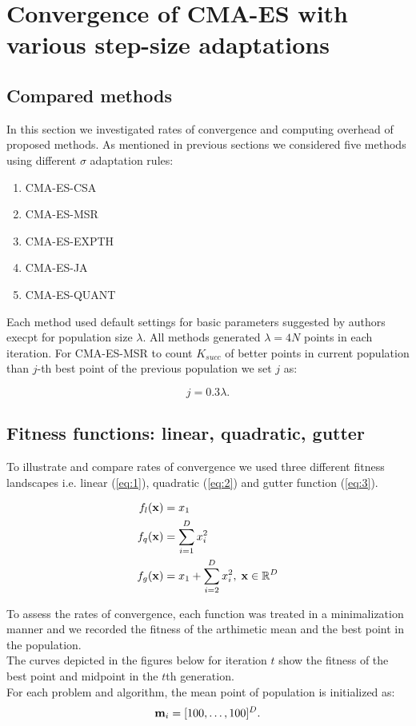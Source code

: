 \documentclass[runningheads,a4paper]{llncs}
\newcommand{\wec}[1]{
	{\bf{#1}} 
}
\begin{document}
\section{Convergence of CMA-ES with various step-size adaptations}
\subsection{Compared methods}

In this section we investigated rates of convergence and computing overhead of proposed methods. 
As mentioned in previous sections we considered five methods using different $\sigma$ adaptation rules:
  \begin{enumerate}
    \item CMA-ES-CSA
    \item CMA-ES-MSR
    \item CMA-ES-EXPTH
    \item CMA-ES-JA
    \item CMA-ES-QUANT
  \end{enumerate}

Each method used default settings for basic parameters suggested by authors execpt for 
population size $\lambda$. All methods generated $\lambda = 4N$ points in each iteration.
For CMA-ES-MSR to count $K_{succ}$ of better points in current population than $j$-th best point 
of the previous population we set $j$ as:

\begin{equation*}
j = 0.3\lambda.
\end{equation*}

\subsection{Fitness functions: linear, quadratic, gutter}

To illustrate and compare rates of convergence we used three different fitness landscapes i.e. linear (\ref{eq:1}), quadratic
(\ref{eq:2}) and gutter function (\ref{eq:3}).

\begin{align}
  f_{l}(\wec{x}) &= x_{1}  \label{eq:1} \\
  f_{q}(\wec{x}) &= \sum^{D}_{i = 1} x^{2}_{i} \label{eq:2} \\
  f_{g}(\wec{x}) &= x_{1} + \sum^{D}_{i = 2} x^{2}_{i}, \; \wec{x} \in \mathbb{R}^{D}  \label{eq:3}
\end{align}

To assess the rates of convergence, each function was treated in a minimalization manner and we recorded the fitness of the 
arthimetic mean and the best point in the population. \\
The curves depicted in the figures below for iteration $t$ show the fitness of the best point and midpoint in the $t$th generation. \\ 
For each problem and algorithm, the mean point of population is initialized as:
\begin{equation*}
  \wec{m}_{i} = [100, \dots, 100]^{D}.
\end{equation*}
\end{document}
